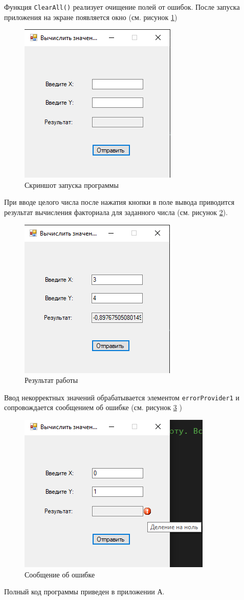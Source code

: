 Функция \verb|ClearAll()| реализует очищение полей от ошибок.
После запуска приложения на экране появляется окно (см. рисунок \ref{fig:exec2})
\begin{figure}[H]
    \centering
    \includegraphics{task2/exec.png}
    \caption{Скриншот запуска программы}
    \label{fig:exec2}
\end{figure}
При вводе целого числа после нажатия кнопки в поле вывода приводится
результат вычисления факториала для заданного числа (см. рисунок \ref{fig:result2}).
\begin{figure}[H]
    \centering
    \includegraphics{task2/result.png}
    \caption{Результат работы}
    \label{fig:result2}
\end{figure}
Ввод некорректных значений обрабатывается элементом \verb|errorProvider1| и 
сопровождается сообщением об ошибке (см. рисунок \ref{fig:error2} )
\begin{figure}[H]
    \centering
    \includegraphics{task2/error.png}
    \caption{Сообщение об ошибке}
    \label{fig:error2}
\end{figure}
Полный код программы приведен в приложении А.